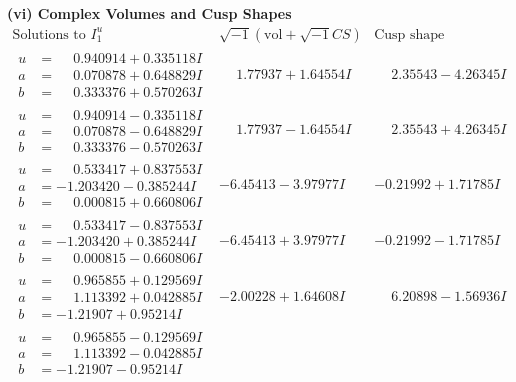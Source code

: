 \documentclass[1p]{elsarticle_modified}
\theoremstyle{definition}
\newcommand{\I}{\sqrt{-1}}
\begin{document}
\newpage\flushleft \textbf{(vi) Complex Volumes and Cusp Shapes}
$$\begin{array}{c|c|c}  
\text{Solutions to }I^u_{1}& \I (\text{vol} + \sqrt{-1}CS) & \text{Cusp shape}\\
 \hline 
\begin{aligned}
u &= \phantom{-}0.940914 + 0.335118 I \\
a &= \phantom{-}0.070878 + 0.648829 I \\
b &= \phantom{-}0.333376 + 0.570263 I\end{aligned}
 & \phantom{-}1.77937 + 1.64554 I & \phantom{-}2.35543 - 4.26345 I \\ \hline\begin{aligned}
u &= \phantom{-}0.940914 - 0.335118 I \\
a &= \phantom{-}0.070878 - 0.648829 I \\
b &= \phantom{-}0.333376 - 0.570263 I\end{aligned}
 & \phantom{-}1.77937 - 1.64554 I & \phantom{-}2.35543 + 4.26345 I \\ \hline\begin{aligned}
u &= \phantom{-}0.533417 + 0.837553 I \\
a &= -1.203420 - 0.385244 I \\
b &= \phantom{-}0.000815 + 0.660806 I\end{aligned}
 & -6.45413 - 3.97977 I & -0.21992 + 1.71785 I \\ \hline\begin{aligned}
u &= \phantom{-}0.533417 - 0.837553 I \\
a &= -1.203420 + 0.385244 I \\
b &= \phantom{-}0.000815 - 0.660806 I\end{aligned}
 & -6.45413 + 3.97977 I & -0.21992 - 1.71785 I \\ \hline\begin{aligned}
u &= \phantom{-}0.965855 + 0.129569 I \\
a &= \phantom{-}1.113392 + 0.042885 I \\
b &= -1.21907 + 0.95214 I\end{aligned}
 & -2.00228 + 1.64608 I & \phantom{-}6.20898 - 1.56936 I \\ \hline\begin{aligned}
u &= \phantom{-}0.965855 - 0.129569 I \\
a &= \phantom{-}1.113392 - 0.042885 I \\
b &= -1.21907 - 0.95214 I\end{aligned}

\end{array}$$
\end{document}
